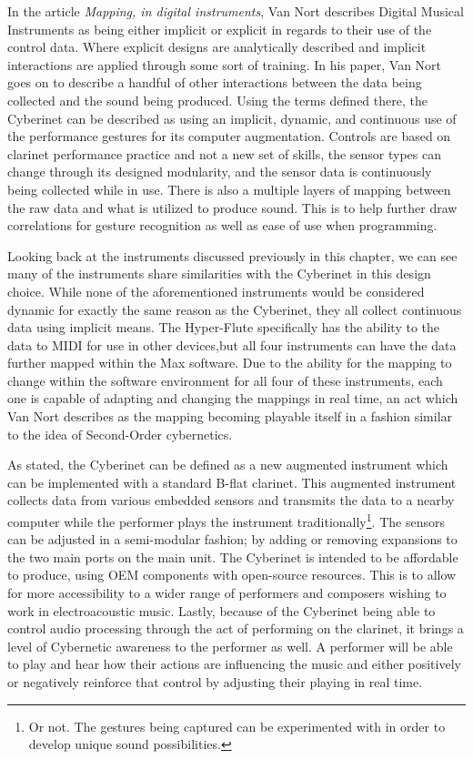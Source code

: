 In the article \textit{Mapping, in digital instruments}\cite{vanNortMapping2007}, Van Nort describes Digital Musical Instruments as being either implicit or explicit in regards to their use of the control data. Where explicit designs are analytically described and implicit interactions are applied through some sort of training\cite{vanNortMapping2007}. In his paper, Van Nort goes on to describe a handful of other interactions between the data being collected and the sound being produced. Using the terms defined there, the Cyberinet can be described as using an implicit, dynamic, and continuous use of the performance gestures for its computer augmentation. Controls are based on clarinet performance practice and not a new set of skills, the sensor types can change through its designed modularity, and the sensor data is continuously being collected while in use. There is also a multiple layers of mapping between the raw data and what is utilized to produce sound. This is to help further draw correlations for gesture recognition as well as ease of use when programming.

Looking back at the instruments discussed previously in this chapter, we can see many of the instruments share similarities with the Cyberinet in this design choice. While none of the aforementioned instruments would be considered dynamic for exactly the same reason as the Cyberinet, they all collect continuous data using implicit means. The Hyper-Flute specifically has the ability to the data to MIDI for use in other devices,but all four instruments can have the data further mapped within the Max software. Due to the ability for the mapping to change within the software environment for all four of these instruments, each one is capable of adapting and changing the mappings in real time, an act which Van Nort describes as the mapping becoming playable itself\cite{vanNortMapping2007} in a fashion similar to the idea of Second-Order cybernetics.

As stated, the Cyberinet can be defined as a new augmented instrument which can be implemented with a standard B-flat clarinet. This augmented instrument collects data from various embedded sensors and transmits the data to a nearby computer while the performer plays the instrument traditionally\footnote{Or not. The gestures being captured can be experimented with in order to develop unique sound possibilities.}. The sensors can be adjusted in a semi-modular fashion; by adding or removing expansions to the two main ports on the main unit. The Cyberinet is intended to be affordable to produce, using OEM components with open-source resources. This is to allow for more accessibility to a wider range of performers and composers wishing to work in electroacoustic music. Lastly, because of the Cyberinet being able to control audio processing through the act of performing on the clarinet, it brings a level of Cybernetic awareness to the performer as well. A performer will be able to play and hear how their actions are influencing the music and either positively or negatively reinforce that control by adjusting their playing in real time. 

